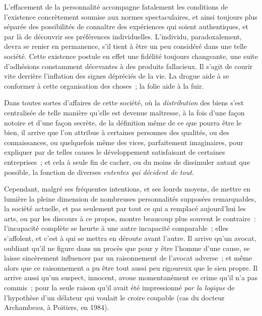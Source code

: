 \documentclass[french,twoside]{book} %
\def\bignobreak{\ifdim\lastskip<\bigskipamount
  \removelastskip\nopagebreak\bigskip\fi}
\newcommand{\labelblock}[1]{\bigbreak{\color{rubric}\noindent\textbf{#1}\par}\bignobreak}
\begin{document}
\labelblock{XII}

\noindent L’effacement de la personnalité accompagne fatalement les conditions de l’existence concrètement soumise aux normes spectaculaires, et ainsi toujours plus séparée des possibilités de connaître des expériences qui soient authentiques, et par là de découvrir ses préférences individuelles. L’individu, paradoxalement, devra se renier en permanence, s’il tient à être un peu considéré dans une telle société. Cette existence postule en effet une fidélité toujours changeante, une suite d’adhésions constamment décevantes à des produits fallacieux. Il s’agit de courir vite derrière l’inflation des signes dépréciés de la vie. La drogue aide à se conformer à cette organisation des choses ; la folie aide à la fuir.\par
Dans toutes sortes d’affaires de cette société, où la \emph{distribution} des biens s’est centralisée de telle manière qu’elle est devenue maîtresse, à la fois d’une façon notoire et d’une façon secrète, de la définition même de ce que pourra être le bien, il arrive que l’on attribue à certaines personnes des qualités, ou des connaissances, ou quelquefois même des vices, parfaitement imaginaires, pour expliquer par de telles causes le développement satisfaisant de certaines entreprises ; et cela à seule fin de cacher, ou du moins de dissimuler autant que possible, la fonction de diverses \emph{ententes qui décident de tout}.\par
Cependant, malgré ses fréquentes intentions, et ses lourds moyens, de mettre en lumière la pleine dimension de nombreuses personnalités supposées remarquables, la société actuelle, et pas seulement par tout ce qui a remplacé aujourd’hui les arts, ou par les discours à ce propos, montre beaucoup plus souvent le contraire : l’incapacité complète se heurte à une autre incapacité comparable ; elles s’affolent, et c’est à qui se mettra en déroute avant l’autre. Il arrive qu’un avocat, oubliant qu’il ne figure dans un procès que pour y être l’homme d’une cause, se laisse sincèrement influencer par un raisonnement de l’avocat adverse ; et même alors que ce raisonnement a pu être tout aussi peu rigoureux que le sien propre. Il arrive aussi qu’un suspect, innocent, avoue momentanément ce crime qu’il n’a pas commis ; pour la seule raison qu’il avait été impressionné \emph{par la logique} de l’hypothèse d’un délateur qui voulait le croire coupable (cas du docteur Archambeau, à Poitiers, en 1984).\par
\end{document}
